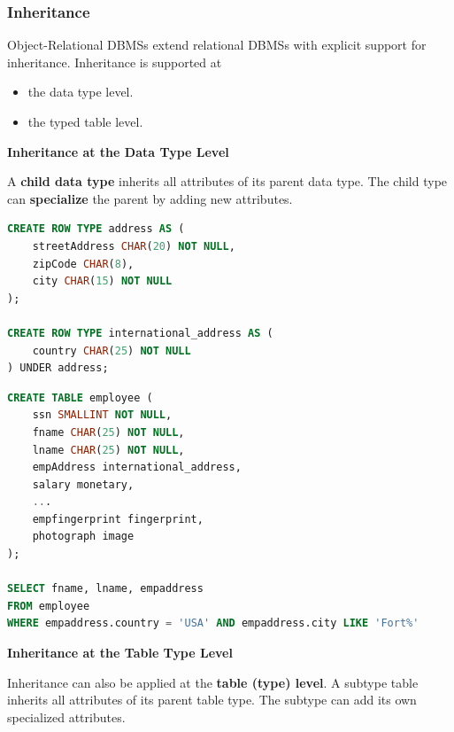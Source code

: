 \documentclass[11pt]{article}
\newcommand{\sssec}[1]{
    \vspace{11pt}
    \subsubsection{#1}
    \vspace{11pt}
}
\newcommand{\boldsec}[1]{
    \vspace{11pt}
    \textbf{#1}
    \vspace{11pt}
}
\begin{document}
\sssec{Inheritance}

Object-Relational DBMSs extend relational DBMSs with explicit support for inheritance. Inheritance is supported at
\begin{itemize}
    \item the data type level.
    \item the typed table level.
\end{itemize}
\vspace{11pt}

\boldsec{Inheritance at the Data Type Level}

A \textbf{child data type} inherits all attributes of its parent data type. The child type can \textbf{specialize} the parent by adding new attributes.

\vspace{11pt}
\begin{lstlisting}[language=sql, breaklines=true, showstringspaces=false]
CREATE ROW TYPE address AS (
    streetAddress CHAR(20) NOT NULL,
    zipCode CHAR(8),
    city CHAR(15) NOT NULL
);

CREATE ROW TYPE international_address AS (
    country CHAR(25) NOT NULL
) UNDER address;
\end{lstlisting}
\vspace{11pt}

\vspace{11pt}
\begin{lstlisting}[language=sql, breaklines=true, showstringspaces=false]
CREATE TABLE employee ( 
    ssn SMALLINT NOT NULL,
    fname CHAR(25) NOT NULL,
    lname CHAR(25) NOT NULL,
    empAddress international_address,
    salary monetary,
    ...
    empfingerprint fingerprint,
    photograph image
);

SELECT fname, lname, empaddress
FROM employee
WHERE empaddress.country = 'USA' AND empaddress.city LIKE 'Fort%'
\end{lstlisting}
\vspace{11pt}

\boldsec{Inheritance at the Table Type Level}

Inheritance can also be applied at the \textbf{table (type) level}. A subtype table inherits all attributes of its parent table type. The subtype can add its own specialized attributes.
\end{document}
